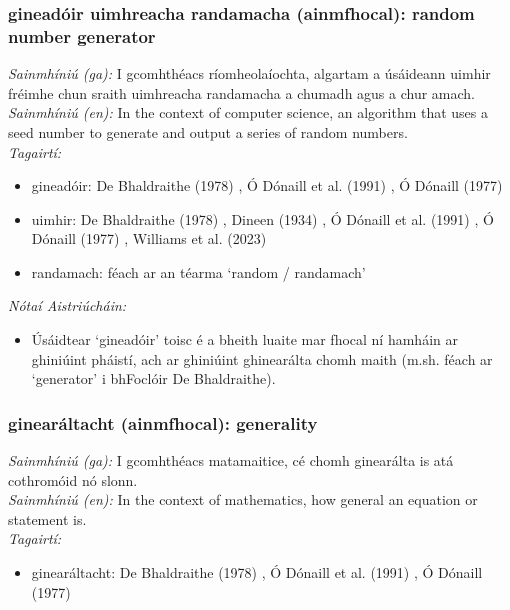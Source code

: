 \subsubsection*{gineadóir uimhreacha randamacha (ainmfhocal): random number generator}
 \noindent \textit{Sainmhíniú (ga):} I gcomhthéacs ríomheolaíochta, algartam a úsáideann uimhir fréimhe chun sraith uimhreacha randamacha a chumadh agus a chur amach.
\\
 \noindent \textit{Sainmhíniú (en):} In the context of computer science, an algorithm that uses a seed number to generate and output a series of random numbers.
\\
 \noindent \textit{Tagairtí:}
\begin{itemize}
	\item gineadóir: De Bhaldraithe (1978) \cite{de-bhaldraithe}, Ó Dónaill et al. (1991) \cite{focloir-beag}, Ó Dónaill (1977) \cite{odonaill}
	\item uimhir: De Bhaldraithe (1978) \cite{de-bhaldraithe}, Dineen (1934) \cite{dineen}, Ó Dónaill et al. (1991) \cite{focloir-beag}, Ó Dónaill (1977) \cite{odonaill}, Williams et al. (2023) \cite{storchiste}
	\item randamach: féach ar an téarma `random / randamach'
\end{itemize}

 \noindent \textit{Nótaí Aistriúcháin:}
\begin{itemize}
	\item Úsáidtear `gineadóir' toisc é a bheith luaite mar fhocal ní hamháin ar ghiniúint pháistí, ach ar ghiniúint ghinearálta chomh maith (m.sh. féach ar `generator' i bhFoclóir De Bhaldraithe).
\end{itemize}


\subsubsection*{ginearáltacht (ainmfhocal): generality}
 \noindent \textit{Sainmhíniú (ga):} I gcomhthéacs matamaitice, cé chomh ginearálta is atá cothromóid nó slonn.
\\
 \noindent \textit{Sainmhíniú (en):} In the context of mathematics, how general an equation or statement is.
\\
 \noindent \textit{Tagairtí:}
\begin{itemize}
	\item ginearáltacht: De Bhaldraithe (1978) \cite{de-bhaldraithe}, Ó Dónaill et al. (1991) \cite{focloir-beag}, Ó Dónaill (1977) \cite{odonaill}
\end{itemize}

